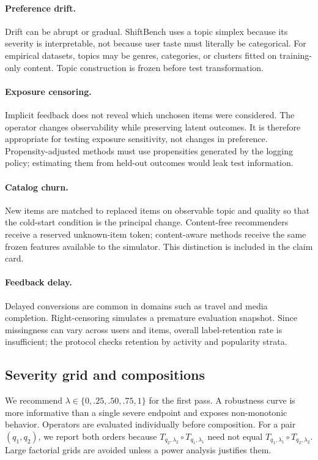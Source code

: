 \paragraph{Preference drift.}
Drift can be abrupt or gradual.  ShiftBench uses a topic simplex because its
severity is interpretable, not because user taste must literally be categorical.
For empirical datasets, topics may be genres, categories, or clusters fitted on
training-only content.  Topic construction is frozen before test transformation.

\paragraph{Exposure censoring.}
Implicit feedback does not reveal which unchosen items were considered.  The
operator changes observability while preserving latent outcomes.  It is therefore
appropriate for testing exposure sensitivity, not changes in preference.
Propensity-adjusted methods must use propensities generated by the logging policy;
estimating them from held-out outcomes would leak test information.

\paragraph{Catalog churn.}
New items are matched to replaced items on observable topic and quality so that
the cold-start condition is the principal change.  Content-free recommenders
receive a reserved unknown-item token; content-aware methods receive the same
frozen features available to the simulator.  This distinction is included in
the claim card.

\paragraph{Feedback delay.}
Delayed conversions are common in domains such as travel and media completion.
Right-censoring simulates a premature evaluation snapshot.  Since missingness can
vary across users and items, overall label-retention rate is insufficient; the
protocol checks retention by activity and popularity strata.

\subsection{Severity grid and compositions}

We recommend $\lambda\in\{0,.25,.50,.75,1\}$ for the first pass.  A robustness
curve is more informative than a single severe endpoint and exposes non-monotonic
behavior.  Operators are evaluated individually before composition.  For a pair
$(q_1,q_2)$, we report both orders because
$T_{q_2,\lambda_2}\circ T_{q_1,\lambda_1}$ need not equal
$T_{q_1,\lambda_1}\circ T_{q_2,\lambda_2}$.  Large factorial grids are avoided
unless a power analysis justifies them.

